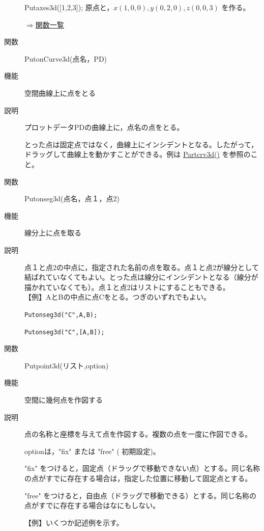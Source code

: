 \documentclass[papersize,a4paper,12pt,uplatex]{jsarticle}
\begin{document}
\begin{description}
 Putaxes3d([1,2,3]);  原点と，$x(1,0,0),y(0,2,0),z(0,0,3)$ を作る。

\begin{flushright} \hyperlink{functionlist}{$\Rightarrow$関数一覧}\end{flushright}

\vspace{\baselineskip}
\hypertarget{putonCurve3d}{}
\item[関数]  PutonCurve3d(点名，PD)
\item[機能]  空間曲線上に点をとる
\item[説明]  プロットデータPDの曲線上に，点名の点をとる。

とった点は固定点ではなく，曲線上にインシデントとなる。したがって，ドラッグして曲線上を動かすことができる。例は \hyperlink{partcrv3d}{Partcrv3d()} を参照のこと。

\vspace{\baselineskip}
\hypertarget{putonseg3d}{}
\item[関数]  Putonseg3d(点名，点１，点2)
\item[機能]  線分上に点を取る
\item[説明]  点１と点2の中点に，指定された名前の点を取る。点１と点2が線分として結ばれていなくてもよい。とった点は線分にインシデントとなる（線分が描かれていなくても）。点１と点2はリストにすることもできる。\\
\vspace{\baselineskip}
【例】AとBの中点に点Cをとる。つぎのいずれでもよい。

    \verb|Putonseg3d("C",A,B);|

    \verb|Putonseg3d("C",[A,B]);|
    
\vspace{\baselineskip}

\hypertarget{putpoint3d}{}
\item[関数]  Putpoint3d(リスト,option)
\item[機能]  空間に幾何点を作図する
\item[説明]  点の名称と座標を与えて点を作図する。複数の点を一度に作図できる。

optionは，"fix" または "free" ( 初期設定)。
 
"fix" をつけると，固定点（ドラッグで移動できない点）とする。同じ名称の点がすでに存在する場合は，指定した位置に移動して固定点とする。

"free" をつけると，自由点（ドラッグで移動できる）とする。同じ名称の点がすでに存在する場合はなにもしない。

\vspace{\baselineskip}
【例】いくつか記述例を示す。


\end{description}
\end{document}
